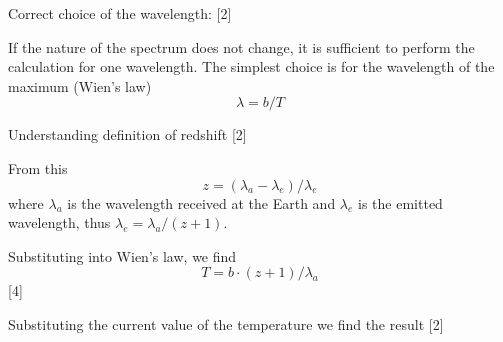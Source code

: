 Correct choice of the wavelength: \hfill[2]

If the nature of the spectrum does not change, it is sufficient to perform the
calculation for one wavelength. The simplest choice is for the wavelength of
the maximum (Wien's law)
\[
\lambda = b/T
\]

Understanding definition of redshift \hfill[2]

From this
\[
z = (\lambda_a - \lambda_e)/\lambda_e
\]
where $\lambda_a$ is the wavelength received at the Earth and $\lambda_e$ is
the emitted wavelength, thus $\lambda_e = \lambda_a/(z+1)$.

Substituting into Wien's law, we find
\[
T = b\cdot(z+1)/\lambda_a
\]
\hfill[4]

Substituting the current value of the temperature we find the result \hfill[2]
